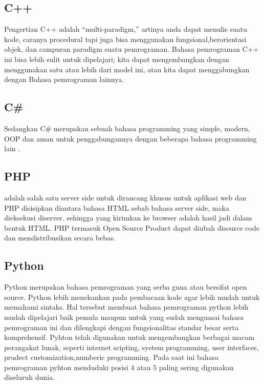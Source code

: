\subsection {C++}
	Pengertian C++ adalah “multi-paradigm,” artinya anda dapat menulis suatu kode, caranya procedural 
tapi juga bisa menggunakan fungsional,berorientasi objek, dan campuran paradigm suatu pemrograman.  
Bahasa pemrograman C++ ini bisa lebih sulit untuk dipelajari; kita dapat mengembangkan dengan 
menggunakan satu atau lebih dari model ini,  atau kita dapat menggabungkan dengan Bahasa pemrograman lainnya.

\subsection {C\#}
	Sedangkan C\# merupakan sebuah bahasa programming yang simple, modern, OOP dan aman untuk 
penggabungannya dengan beberapa bahasa programming lain
\cite{hejlsberg2003c}.

\subsection {PHP}
 	adalah salah satu server side untuk dirancang khusus untuk aplikasi web dan PHP disisipkan diantara bahasa HTML sebab bahasa server side, maka dieksekusi diserver. sehingga yang kirimkan ke browser adalah hasil jadi dalam bentuk HTML. PHP termasuk Open Source Product dapat diubah disource code dan mendistribusikan secara bebas.

\subsection{Python}
	Python merupakan  bahasa pemrograman yang serba guna atau bersifat open source. 
Python lebih menekankan pada pembacaan  kode agar lebih mudah untuk memahami sintaks. 
Hal tersebut membuat bahasa pemrograman python lebih mudah dipelajari baik pemula maupun untuk yang 
sudah menguasai bahasa pemrograman ini dan dilengkapi dengan fungsionalitas standar besar serta 
komprehensif. Pyhton telah digunakan untuk mengembangkan berbagai macam perangakat lunak, seperti 
internet scipting, system programming, user interfaces, prudect customization,numberic programming. 
Pada saat ini bahasa pemrograman pyhton menduduki posisi 4 atau 5 paling sering digunakan diseluruh dunia.

